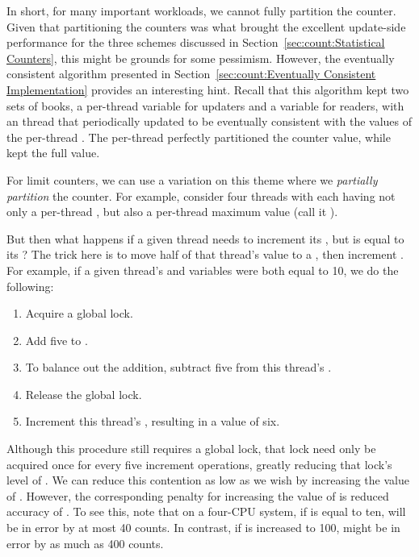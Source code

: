 In short, for many important workloads, we cannot fully partition the counter.
Given that partitioning the counters was what brought the excellent
update-side performance for the three schemes discussed in
Section~\ref{sec:count:Statistical Counters}, this might be grounds
for some pessimism.
However, the eventually consistent algorithm presented in
Section~\ref{sec:count:Eventually Consistent Implementation}
provides an interesting hint.
Recall that this algorithm kept two sets of books, a
per-thread  variable for updaters and a 
variable for readers, with an  thread that periodically
updated  to be eventually consistent with the values
of the per-thread .
The per-thread  perfectly partitioned the counter value, while
 kept the full value.

For limit counters, we can use a variation on this theme where we
\emph{partially partition} the counter.
For example, consider four threads with each having not only a
per-thread , but also a per-thread maximum value (call
it ).

But then what happens if a given thread needs to increment its
, but  is equal to its ?
The trick here is to move half of that thread's  value
to a , then increment .
For example, if a given thread's  and 
variables were both equal to 10, we do the following:

\begin{enumerate}
\item	Acquire a global lock.
\item	Add five to .
\item	To balance out the addition, subtract five from this
	thread's .
\item	Release the global lock.
\item	Increment this thread's , resulting in a value of six.
\end{enumerate}

Although this procedure still requires a global lock, that lock need only be
acquired once for every five increment operations, greatly reducing
that lock's level of .
We can reduce this contention as low as we wish by increasing the
value of .
However, the corresponding penalty for increasing the value of
 is reduced accuracy of .
To see this, note that on a four-CPU system, if 
is equal to ten,  will be in error by at most
40 counts.
In contrast, if  is increased to 100, 
might be in error by as much as 400 counts.


